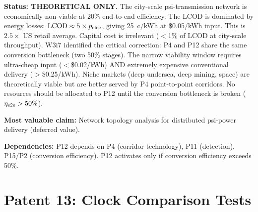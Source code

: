 \documentclass[11pt]{article}
\begin{document}
\begin{tcolorbox}[colback=orange!5!white, colframe=orange!60!black,
  title=\textbf{P12: THEORETICAL ONLY --- Resource Allocation: 0/5}]
\textbf{Status: THEORETICAL ONLY.}
The city-scale psi-transmission network is economically non-viable at
20\% end-to-end efficiency. The LCOD is dominated by energy losses:
$\text{LCOD} \approx 5 \times p_{\rm elec}$, giving 25~c/kWh at
\$0.05/kWh input. This is $2.5\times$ US retail average. Capital cost
is irrelevant ($<$1\% of LCOD at city-scale throughput). W3i7 identified
the critical correction: P4 and P12 share the same conversion bottleneck
(two 50\% stages). The narrow viability window requires ultra-cheap
input ($<$\$0.02/kWh) AND extremely expensive conventional delivery
($>$\$0.25/kWh). Niche markets (deep undersea, deep mining, space)
are theoretically viable but are better served by P4 point-to-point
corridors. No resources should be allocated to P12 until the
conversion bottleneck is broken ($\eta_{\rm e2e} > 50\%$).

\textbf{Most valuable claim:} Network topology analysis for distributed
psi-power delivery (deferred value).

\textbf{Dependencies:} P12 depends on P4 (corridor technology), P11
(detection), P15/P2 (conversion efficiency). P12 activates only if
conversion efficiency exceeds 50\%.
\end{tcolorbox}

\section{Patent 13: Clock Comparison Tests}
\label{sec:P13}
\end{document}
